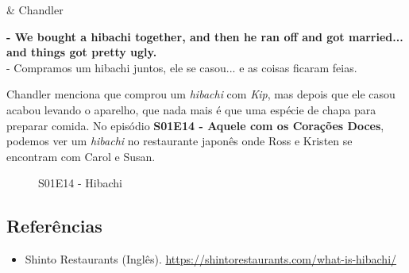\begin{tcolorbox}[enhanced,center upper,
    drop fuzzy shadow southeast, boxrule=0.3pt,
    lower separated=false,
    colframe=black!30!dialogoBorder,colback=white]
\begin{minipage}[c]{0.16\linewidth}
   & \centering \scriptsize{Chandler}
\end{minipage}
\hfill
\begin{minipage}[c]{0.8\linewidth}
  \textbf{- We bought a hibachi together, and then he ran off and got married... and things got pretty ugly.}\\
  - Compramos um hibachi juntos, ele se casou...  e as coisas ficaram feias.
\end{minipage}
\end{tcolorbox}

Chandler menciona que comprou um \emph{hibachi} com \emph{Kip}, mas
depois que ele casou acabou levando o aparelho, que nada mais é que uma
espécie de chapa para preparar comida. No episódio
\textbf{\textcolor{primarycolor}{S01E14 - Aquele com os Corações Doces}},
podemos ver um \emph{hibachi} no restaurante japonês onde Ross e Kristen
se encontram com Carol e Susan.

\begin{figure}
  \centering
    \caption{S01E14 - Hibachi\label{fig:s01-e14-hibachi}}
\end{figure}

\hypertarget{referuxeancias-3}{%
\subsection{Referências}\label{referuxeancias-3}}

\begin{itemize}
\tightlist
\item
  \sloppy Shinto Restaurants (Inglês). \url{https://shintorestaurants.com/what-is-hibachi/}
\end{itemize}
